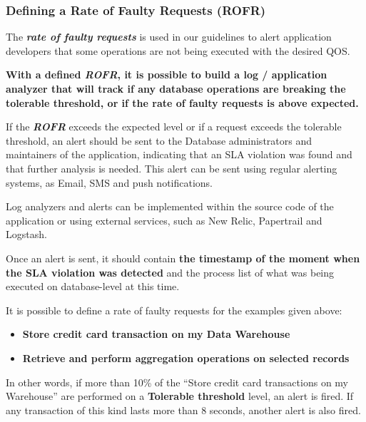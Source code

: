\subsubsection{Defining a Rate of Faulty Requests (ROFR)}



The \textbf{\textit{rate of faulty requests}} is used in our guidelines to alert application developers that some operations are not being executed with the desired QOS.

\textbf{With a defined \textbf{\textit{ROFR}}, it is possible to build a log / application analyzer that will track if any database operations are breaking the tolerable threshold, or if the rate of faulty requests is above expected.}

If the \textbf{\textit{ROFR}} exceeds the expected level or if a request exceeds the tolerable threshold, an alert should be sent to the Database administrators and maintainers of the application, indicating that an SLA violation was found and that further analysis is needed. This alert can be sent using regular alerting systems, as Email, SMS and push notifications.

Log analyzers and alerts can be implemented within the source code of the application or using external services, such as New Relic, Papertrail and Logstash. 

Once an alert is sent, it should contain \textbf{the timestamp of the moment when the SLA violation was detected} and the process list of what was being executed on database-level at this time. 

It is possible to define a rate of faulty requests for the examples given above: 
\begin{itemize}
\item{ 
\textbf{Store credit card transaction on my Data Warehouse}
}

\item{
\textbf{Retrieve and perform aggregation operations on selected records}
}
\end{itemize}

In other words, if more than 10\% of the ``Store credit card transactions on my Warehouse'' are performed on a \textbf{Tolerable threshold} level, an alert is fired. If any transaction of this kind lasts more than 8 seconds, another alert is also fired. 


